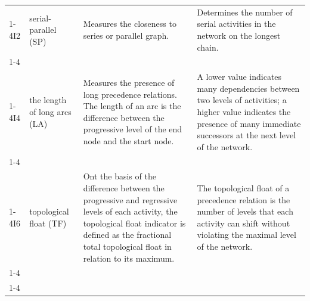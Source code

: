 \documentclass[preprint,
3p]{elsarticle} %
\begin{document}
\begin{appendices}
\begin{longtable}[t]{l>{\raggedright\arraybackslash}p{2.2cm}>{\raggedright\arraybackslash}p{3.6cm}>{\raggedright\arraybackslash}p{3.6cm}}
\endfoot
\bottomrule
\endlastfoot
\cellcolor{gray!10}{TASKS} & \cellcolor{gray!10}{number of activities} & \cellcolor{gray!10}{Measures the size of the network as the number of activities.} & \cellcolor{gray!10}{How many activities are present in the project (portfolio).}\\
\cmidrule{1-4}\pagebreak[0]
I2 & serial-parallel (SP) & Measures the closeness to series or parallel graph. & Determines the number of serial activities in the network on the longest chain.\\
\cmidrule{1-4}\pagebreak[0]
\cellcolor{gray!10}{I3} & \cellcolor{gray!10}{activity distribution (AD)} & \cellcolor{gray!10}{Measures the distribution of the activities over the progressive levels on the basis of the width of each progressive level in the network.} & \cellcolor{gray!10}{Measures how the project activities that do not belong to the longest chain are distributed in the network.}\\
\cmidrule{1-4}\pagebreak[0]
I4 & the length of long arcs (LA) & Measures the presence of long precedence relations. The length of an arc is the difference between the progressive level of the end node and the start node. & A lower value indicates many dependencies between two levels of activities; a higher value indicates the presence of many immediate successors at the next level of the network.\\
\cmidrule{1-4}\pagebreak[0]
\cellcolor{gray!10}{I5} & \cellcolor{gray!10}{short arcs (SA)} & \cellcolor{gray!10}{Measures the presence of short precedence relations. The length of an arc is the difference between the progressive level of the end node and the start node.} & \cellcolor{gray!10}{Alternative for I4 (length of long arcs).}\\
\cmidrule{1-4}\pagebreak[0]
I6 & topological float (TF) & Ont the basis of the difference between the progressive and regressive levels of each activity, the topological float indicator is defined as the fractional total topological float in relation to its maximum. & The topological float of a precedence relation is the number of levels that each activity can shift without violating the maximal level of the network.\\
\cmidrule{1-4}\pagebreak[0]
\cellcolor{gray!10}{C} & \cellcolor{gray!10}{network complexity} & \cellcolor{gray!10}{The average number of non-redundant arcs per node.} & \cellcolor{gray!10}{The number of redundant arcs should not have an influence on project complexity.}\\
\cmidrule{1-4}\pagebreak[0]

\end{longtable}
\end{appendices}
\end{document}
